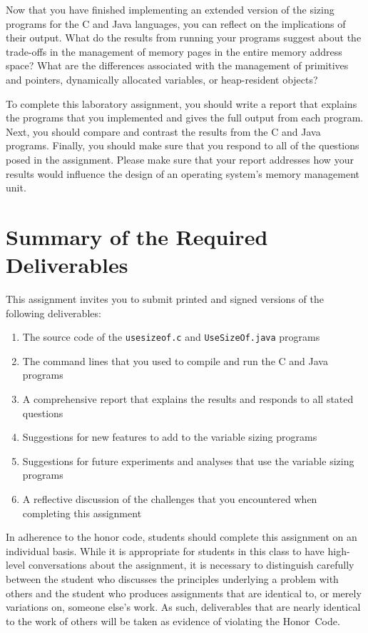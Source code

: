   Now that you have finished implementing an extended version of the sizing programs for the C and Java languages, you
  can reflect on the implications of their output. What do the results from running your programs suggest about the
  trade-offs in the management of memory pages in the entire memory address space? What are the differences associated
  with the management of primitives and pointers, dynamically allocated variables, or heap-resident objects? 
  
  To complete this laboratory assignment, you should write a report that explains the programs that you implemented and
  gives the full output from each program.  Next, you should compare and contrast the results from the C and Java
  programs.  Finally, you should make sure that you respond to all of the questions posed in the assignment. Please make
  sure that your report addresses how your results would influence the design of an operating system's memory
  management unit. 

\section*{Summary of the Required Deliverables}

This assignment invites you to submit printed and signed versions of the following deliverables: 

\begin{enumerate}

  \item The source code of the {\tt usesizeof.c} and {\tt UseSizeOf.java} programs

  \item The command lines that you used to compile and run the C and Java programs

  \item A comprehensive report that explains the results and responds to all stated questions 

  \item Suggestions for new features to add to the variable sizing programs

  \item Suggestions for future experiments and analyses that use the variable sizing programs

  \item A reflective discussion of the challenges that you encountered when completing this assignment

\end{enumerate}

In adherence to the honor code, students should complete this assignment on an individual basis. While it is appropriate
for students in this class to have high-level conversations about the assignment, it is necessary to distinguish
carefully between the student who discusses the principles underlying a problem with others and the student who produces
assignments that are identical to, or merely variations on, someone else's work.  As such, deliverables that are nearly
identical to the work of others will be taken as evidence of violating the \mbox{Honor Code}.  

  
